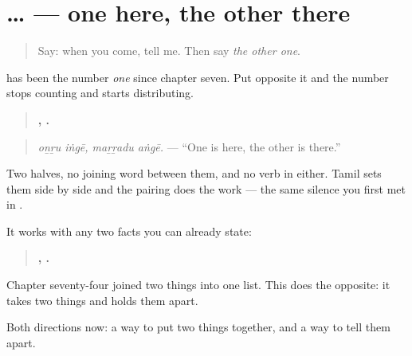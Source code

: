 \section[\texorpdfstring{\ta{ஒன்று} … \ta{மற்றது} (oṉṟu … maṟṟadu)}{ஒன்று … மற்றது (oṉṟu … maṟṟadu)}]{ …  — one here, the other there}

\label{lesson:TA-C80-one-and-other}



\begin{quote}
Say: when you come, tell me. Then say \emph{the other one}.
\end{quote}

\begin{grammarlens}[title={Grammar lens: a pair, split across two halves}]
\textbf{} has been the number \emph{one} since chapter seven. Put \textbf{} opposite it and the number stops counting and starts distributing.

\begin{quote}
\textbf{ ,  .}
\end{quote}

\begin{quote}
\emph{oṉṟu iṅgē, maṟṟadu aṅgē.} — \textquotedblleft{}One is here, the other is there.\textquotedblright{}
\end{quote}

Two halves, no joining word between them, and no verb in either. Tamil sets them side by side and the pairing does the work — the same silence you first met in \textbf{  }.

It works with any two facts you can already state:

\begin{quote}
\textbf{  ,   .}
\end{quote}

Chapter seventy-four joined two things into one list. This does the opposite: it takes two things and holds them apart.
\end{grammarlens}

\begin{grammarlens}[title={What you've built}]
Both directions now: a way to put two things together, and a way to tell them apart.
\end{grammarlens}

